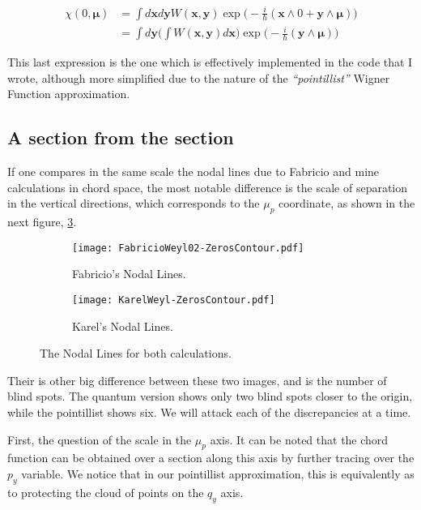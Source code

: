 \documentclass[a4paper,12pt]{article}
\newcommand{\ihb}{\frac{i}{\hbar}}
\newcommand{\xfase}{\mathbf{x}}
\newcommand{\yfase}{\mathbf{y}}
\newcommand{\mufase}{ {\boldsymbol{\mu}} }
\begin{document}
\begin{equation}

\end{equation}


\begin{align}
\chi(0,\mufase) & = \int d\xfase d\yfase
W(\xfase,\yfase )
\exp \big(-\ihb (\xfase\wedge 0+\yfase\wedge\mufase) \big) \\
 & =  \int d \yfase \Biggl( \int W(\xfase, \yfase) d \xfase \Biggr) 
\exp  \bigl(-\ihb (\yfase\wedge\mufase) \bigr) 
\end{align}


This last expression is the one which is effectively implemented in the
code that I wrote, although more simplified due to the nature
of the \emph{``pointillist''} Wigner Function approximation.

\subsection{A section from the section}

If one compares in the same scale the nodal lines due to 
Fabricio and mine calculations in chord space,
the most notable difference is the scale of
separation in the vertical directions, which corresponds
to the $\mu_p$ coordinate, as shown in the next figure,
\ref{comparacionzeros01}. 

\begin{figure}[H]
  \centering
  \begin{subfigure}[b]{0.45\textwidth}
    \centering
          \texttt{[image: FabricioWeyl02-ZerosContour.pdf]}
                \caption{Fabricio's Nodal Lines.}
                \label{FabZeros}
  \end{subfigure}%
\begin{subfigure}[b]{0.45\textwidth}
    \centering
          \texttt{[image: KarelWeyl-ZerosContour.pdf]}
                \caption{Karel's Nodal Lines.}
                \label{KarelZeros}
  \end{subfigure}%
\caption{The Nodal Lines for both calculations. }\label{comparacionzeros01}
\end{figure}

Their is other big difference between these two images, and is
the number of blind spots. The quantum version shows only two
blind spots closer to the origin, while the pointillist
shows six. We will attack each of the discrepancies at a time.

First, the question of the scale in the $\mu_p$ axis.
It can be noted that the chord function can be obtained over
a section along this axis by further tracing over
the $p_y$ variable. We notice that in our pointillist
approximation, this is equivalently as to protecting
the cloud of points on the $q_y$ axis. 
\end{document}

